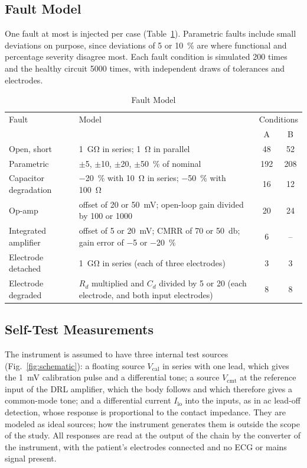 \subsection{Fault Model}

One fault at most is injected per case (Table~\ref{tab:faults}). Parametric faults include small
deviations on purpose, since deviations of 5 or \SI{10}{\percent} are where functional and
percentage severity disagree most. Each fault condition is simulated 200 times and the healthy
circuit \num{5000} times, with independent draws of tolerances and electrodes.

\begin{table}[!t]
\caption{Fault Model}
\label{tab:faults}
\centering
\setlength{\tabcolsep}{3pt}
\begin{tabular}{@{}p{}p{}cc@{}}
\toprule
Fault & Model & \multicolumn{2}{c}{Conditions} \\
 & & A & B \\
\midrule
Open, short & \SI{1}{\giga\ohm} in series; \SI{1}{\ohm} in parallel & 48 & 52 \\
Parametric & $\pm$5, $\pm$10, $\pm$20, $\pm$\SI{50}{\percent} of nominal & 192 & 208 \\
Capacitor degradation & $-$\SI{20}{\percent} with \SI{10}{\ohm} in series; $-$\SI{50}{\percent} with \SI{100}{\ohm} & 16 & 12 \\
Op-amp & offset of 20 or \SI{50}{\milli\volt}; open-loop gain divided by 100 or 1000 & 20 & 24 \\
Integrated amplifier & offset of 5 or \SI{20}{\milli\volt}; CMRR of 70 or \SI{50}{\decibel}; gain error of $-$5 or $-$\SI{20}{\percent} & 6 & -- \\
Electrode detached & \SI{1}{\giga\ohm} in series (each of three electrodes) & 3 & 3 \\
Electrode degraded & $R_d$ multiplied and $C_d$ divided by 5 or 20 (each electrode, and both input electrodes) & 8 & 8 \\
\bottomrule
\end{tabular}
\end{table}

\subsection{Self-Test Measurements}
\label{sec:measurements}

The instrument is assumed to have three internal test sources (Fig.~\ref{fig:schematic}): a
floating source $V_\mathrm{cal}$ in series with one lead, which gives the \SI{1}{\milli\volt}
calibration pulse and a differential tone; a source $V_\mathrm{cmt}$ at the reference input of
the DRL amplifier, which the body follows and which therefore gives a common-mode tone; and a
differential current $I_\mathrm{lo}$ into the inputs, as in ac lead-off detection, whose response
is proportional to the contact impedance. They are modeled as ideal sources; how the instrument
generates them is outside the scope of the study. All responses are read at the output of the
chain by the converter of the instrument, with the patient's electrodes connected and no ECG or
mains signal present.

